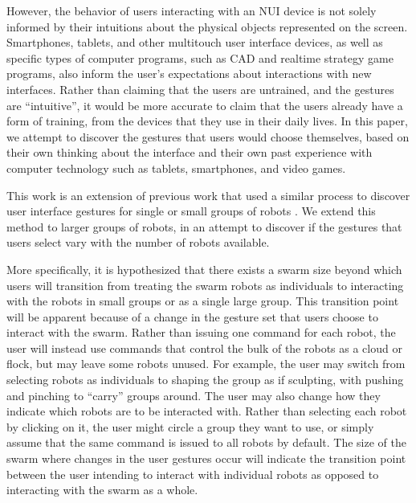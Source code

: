 \documentclass[]{article}
\begin{document}
However, the behavior of users interacting with an NUI device is not solely informed by their intuitions about the physical objects represented on the screen. 
Smartphones, tablets, and other multitouch user interface devices, as well as specific types of computer programs, such as CAD and realtime strategy game programs, also inform the user's expectations about interactions with new interfaces. 
Rather than claiming that the users are untrained, and the gestures are ``intuitive'', it would be more accurate to claim that the users already have a form of training, from the devices that they use in their daily lives. 
In this paper, we attempt to discover the gestures that users would choose themselves, based on their own thinking about the interface and their own past experience with computer technology such as tablets, smartphones, and video games. 

This work is an extension of previous work that used a similar process to discover user interface gestures for single or small groups of robots \cite{Micire:2009:ANG:1731903.1731912}. We extend this method to larger groups of robots, in an attempt to discover if the gestures that users select vary with the number of robots available.

More specifically, it is hypothesized that there exists a swarm size beyond which users will transition from treating the swarm robots as individuals to interacting with the robots in small groups or as a single large group. 
This transition point will be apparent because of a change in the gesture set that users choose to interact with the swarm. 
Rather than issuing one command for each robot, the user will instead use commands that control the bulk of the robots as a cloud or flock, but may leave some robots unused. 
For example, the user may switch from selecting robots as individuals to shaping the group as if sculpting, with pushing and pinching to ``carry'' groups around. 
The user may also change how they indicate which robots are to be interacted with. 
Rather than selecting each robot by clicking on it, the user might circle a group they want to use, or simply assume that the same command is issued to all robots by default. 
The size of the swarm where changes in the user gestures occur will indicate the transition point between the user intending to interact with individual robots as opposed to interacting with the swarm as a whole. 
\end{document}
